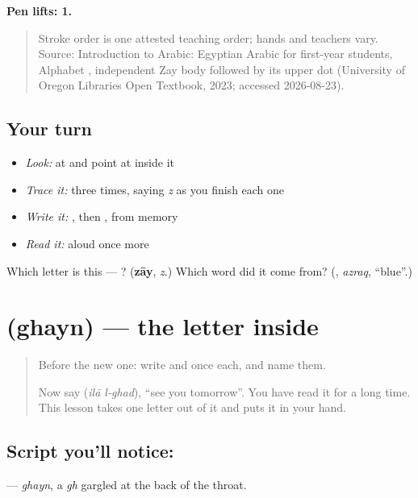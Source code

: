 \textbf{Pen lifts: 1.}

\begin{quote}
Stroke order is one attested teaching order; hands and teachers vary. Source: Introduction to Arabic: Egyptian Arabic for first-year students, Alphabet   , independent Zay body followed by its upper dot (University of Oregon Libraries Open Textbook, 2023; accessed 2026-08-23).
\end{quote}

\subsection*{Your turn}
\begin{itemize}
\raggedright
  \item \emph{Look:} at \textbf{} and point at  inside it
  \item \emph{Trace it:}  three times, saying \emph{z} as you finish each one
  \item \emph{Write it:} , then , from memory
  \item \emph{Read it:} \textbf{} aloud once more
\end{itemize}

\begin{tcolorbox}[breakable,colback=teal!4,colframe=teal!35!black,title={Before you move on}]
Which letter is this — ? (\textbf{zāy}, \emph{z}.) Which word did it come from? (\textbf{}, \emph{azraq}, \textquotedblleft{}blue\textquotedblright{}.)
\end{tcolorbox}
\section[\texorpdfstring{\ar{غ} (ghayn)}{غ (ghayn)}]{ (ghayn) — the letter inside }

\label{lesson:AR-W48-ghayn}



\begin{quote}
Before the new one: write  and  once each, and name them.

Now say \textbf{ } (\emph{ilā l-ghad}), \textquotedblleft{}see you tomorrow\textquotedblright{}. You have read it for a long time. This lesson takes one letter out of it and puts it in your hand.
\end{quote}

\subsection*{Script you'll notice: }
\textbf{} — \emph{ghayn}, a \emph{gh} gargled at the back of the throat.

